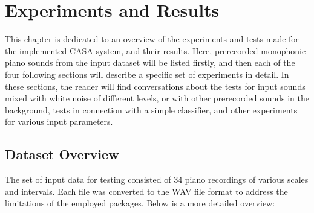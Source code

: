 \chapter{Experiments and Results}\label{chapter:experiments}

This chapter is dedicated to an overview of the experiments and tests made for the implemented CASA system, and their results. Here, prerecorded monophonic piano sounds from the input dataset will be listed firstly, and then each of the four following sections will describe a specific set of experiments in detail. In these sections, the reader will find conversations about the tests for input sounds mixed with white noise of different levels, or with other prerecorded sounds in the background, tests in connection with a simple classifier, and other experiments for various input parameters.

\section{Dataset Overview}\label{section:experiments_dataset}

The set of input data for testing consisted of 34 piano recordings of various scales and intervals. Each file was converted to the WAV file format to address the limitations of the employed packages. Below is a more detailed overview:

